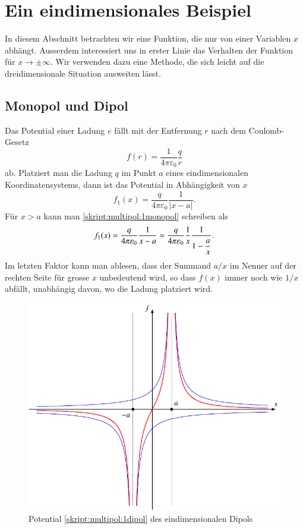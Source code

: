 %
%
%
\section{Ein eindimensionales Beispiel%
\label{skript:multipol:1dimbeispiel}}
In diesem Abschnitt betrachten wir eine Funktion, die nur von einer
Variablen $x$ abhängt.
Ausserdem interessiert uns in erster Linie das Verhalten der Funktion
für $x\to\pm\infty$.
Wir verwenden dazu eine Methode, die sich leicht auf die dreidimensionale
Situation ausweiten lässt.

\subsection{Monopol und Dipol}
Das Potential einer Ladung $e$ fällt mit der Entfernung $r$ nach dem
Coulomb-Gesetz
%
\[
f(r)=\frac1{4\pi\varepsilon_0}\frac{q}r
\]
ab.
Platziert man die Ladung $q$ im Punkt $a$ eines eindimensionalen
Koordinatensystems, dann ist das Potential in Abhängigkeit von $x$
\begin{equation}
f_1(x) = \frac{q}{4\pi\varepsilon_0} \frac1{|x-a|}.
\label{skript:multipol:1monopol}
\end{equation}
Für $x>a$ kann man \eqref{skript:multipol:1monopol} schreiben als
\begin{equation}
f_1(x)
=
\frac{q}{4\pi\varepsilon_0} \frac1{x-a}
=
\frac{q}{4\pi\varepsilon_0} \frac1x\frac1{1-\displaystyle\frac{a\mathstrut}{x}}.
\label{skript:multipol:1abfall}
\end{equation}
Im letzten Faktor kann man ablesen, dass der Summand $a/x$ im Nenner
auf der rechten Seite für grosse $x$ unbedeutend wird, so dass $f(x)$
immer noch wie $1/x$ abfällt, unabhängig davon, wo die Ladung platziert
wird.

\begin{figure}
\centering
\includegraphics{chapters/tikz/dipol1.pdf}
\caption{Potential
\eqref{skript:multipol:1dipol}
des eindimensionalen Dipols
\label{skript:multipol:figure:1dim}}
\end{figure}

